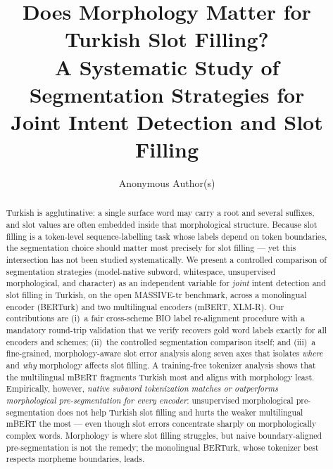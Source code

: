 \documentclass[runningheads]{llncs}
\begin{document}
\title{Does Morphology Matter for Turkish Slot Filling?\\
A Systematic Study of Segmentation Strategies for\\
Joint Intent Detection and Slot Filling}

\author{Anonymous Author(s)}

\maketitle

\begin{abstract}
Turkish is agglutinative: a single surface word may carry a root and several
suffixes, and slot values are often embedded inside that morphological
structure. Because slot filling is a token-level sequence-labelling task whose
labels depend on token boundaries, the segmentation choice should matter most
precisely for slot filling --- yet this intersection has not been studied
systematically. We present a controlled comparison of segmentation strategies
(model-native subword, whitespace, unsupervised morphological, and character) as
an independent variable for \emph{joint} intent detection and slot filling in
Turkish, on the open MASSIVE-tr benchmark, across a monolingual encoder (BERTurk)
and two multilingual encoders (mBERT, XLM-R). Our contributions are
(i)~a fair cross-scheme BIO label re-alignment procedure with a mandatory
round-trip validation that we verify recovers gold word labels exactly for all
encoders and schemes; (ii)~the controlled segmentation comparison itself; and
(iii)~a fine-grained, morphology-aware slot error analysis along seven axes that
isolates \emph{where} and \emph{why} morphology affects slot filling. A
training-free tokenizer analysis shows that the multilingual mBERT fragments
Turkish most and aligns with morphology least. Empirically, however, \emph{native
subword tokenization matches or outperforms morphological pre-segmentation for
every encoder}: unsupervised morphological pre-segmentation does not help Turkish
slot filling and hurts the weaker multilingual mBERT the most --- even though slot
errors concentrate sharply on morphologically complex words. Morphology is where
slot filling struggles, but naive boundary-aligned pre-segmentation is not the
remedy; the monolingual BERTurk, whose tokenizer best respects morpheme
boundaries, leads.
\end{abstract}
\end{document}
